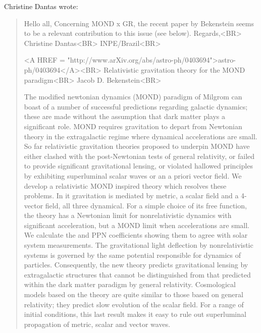 Christine Dantas wrote:

\begin{quote}
Hello all,
Concerning MOND x GR, the recent paper by Bekenstein seems to be 
a relevant contribution to this issue (see below).
Regards,<BR>
Christine Dantas<BR>
INPE/Brazil<BR>

<A HREF = "http://www.arXiv.org/abs/astro-ph/0403694">astro-ph/0403694</A><BR>  
Relativistic gravitation theory for the MOND paradigm<BR>
Jacob D. Bekenstein<BR>

The modified newtonian dynamics (MOND) paradigm of Milgrom can boast
of a number of successful predictions regarding galactic dynamics;
these are made without the assumption that dark matter plays a
significant role. MOND requires gravitation to depart from Newtonian
theory in the extragalactic regime where dynamical accelerations are
small. So far relativistic gravitation theories proposed to underpin
MOND have either clashed with the post-Newtonian tests of general
relativity, or failed to provide significant gravitational lensing, or
violated hallowed principles by exhibiting superluminal scalar waves
or an a priori vector field. We develop a relativistic MOND inspired
theory which resolves these problems. In it gravitation is mediated by
metric, a scalar field and a 4-vector field, all three dynamical. For
a simple choice of its free function, the theory has a Newtonian limit
for nonrelativistic dynamics with significant acceleration, but a MOND
limit when accelerations are small. We calculate the \beta  and \gamma 
PPN coefficients showing them to agree with solar system
measurements. The gravitational light deflection by nonrelativistic
systems is governed by the same potential responsible for dynamics of
particles. Consequently, the new theory predicts gravitational lensing
by extragalactic structures that cannot be distinguished from that
predicted within the dark matter paradigm by general
relativity. Cosmological models based on the theory are quite similar
to those based on general relativity; they predict slow evolution of
the scalar field. For a range of initial conditions, this last result
makes it easy to rule out superluminal propagation of metric, scalar
and vector waves.
\end{quote}

